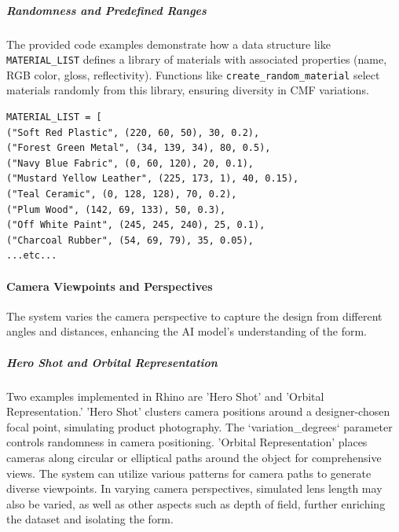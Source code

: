 \documentclass[12pt]{article}
\begin{document}


\subparagraph{Randomness and Predefined Ranges}
 The provided code examples demonstrate how a data structure like \texttt{MATERIAL\_LIST} defines a library of materials with associated properties (name, RGB color, gloss, reflectivity). Functions like \texttt{create\_random\_material} select materials randomly from this library, ensuring diversity in CMF variations.

\begin{verbatim}
MATERIAL_LIST = [
("Soft Red Plastic", (220, 60, 50), 30, 0.2),
("Forest Green Metal", (34, 139, 34), 80, 0.5),
("Navy Blue Fabric", (0, 60, 120), 20, 0.1),
("Mustard Yellow Leather", (225, 173, 1), 40, 0.15),
("Teal Ceramic", (0, 128, 128), 70, 0.2),
("Plum Wood", (142, 69, 133), 50, 0.3),
("Off White Paint", (245, 245, 240), 25, 0.1),
("Charcoal Rubber", (54, 69, 79), 35, 0.05),
...etc...
\end{verbatim}

\paragraph{Camera Viewpoints and Perspectives}
The system varies the camera perspective to capture the design from different angles and distances, enhancing the AI model's understanding of the form.

\subparagraph{Hero Shot and Orbital Representation}
Two examples implemented in Rhino are 'Hero Shot' and 'Orbital Representation.' 'Hero Shot' clusters camera positions around a designer-chosen focal point, simulating product photography. The `variation\_degrees` parameter controls randomness in camera positioning. 'Orbital Representation' places cameras along circular or elliptical paths around the object for comprehensive views. The system can utilize various patterns for camera paths to generate diverse viewpoints. In varying camera perspectives, simulated lens length may also be varied, as well as other aspects such as depth of field, further enriching the dataset and isolating the form.
\end{document}
